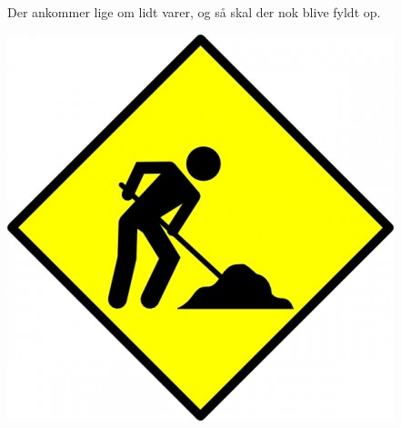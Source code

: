 \documentclass{article}
\begin{document}
\maketitle

\null
\vspace{-1cm}

\begin{center}

\vspace{-1cm}


\vspace{-0.8cm}

\Huge

Der ankommer lige om lidt varer, og så skal der nok blive fyldt op.

\vspace{0.3cm}

\includegraphics[height=.63\textheight]{billeder/under-construction.jpg}

\end{center}

\dansk

\underskriv
\end{document}

